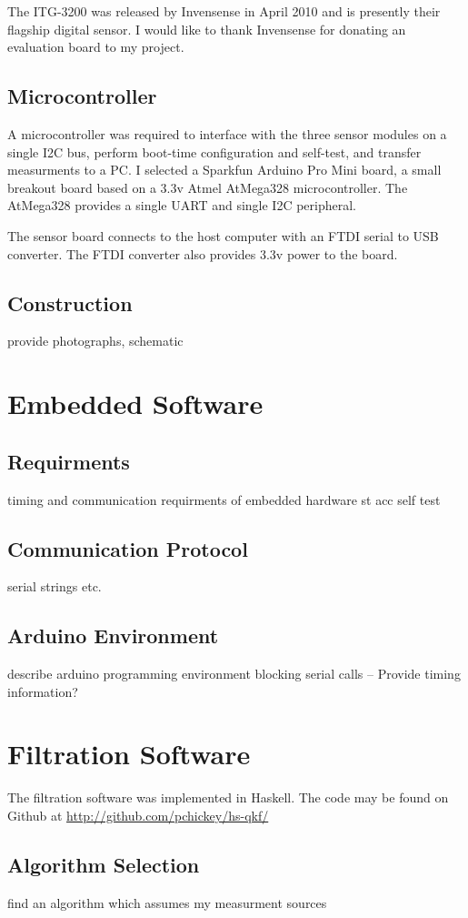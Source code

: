 \documentclass[12pt]{report}
\begin{document}
The ITG-3200 was released by Invensense in April 2010 and is presently their flagship digital sensor. I would like to thank Invensense for donating an evaluation board to my project. 

\subsection{Microcontroller}
A microcontroller was required to interface with the three sensor modules on a single I2C bus, perform boot-time configuration and self-test, and transfer measurments to a PC. I selected a Sparkfun Arduino Pro Mini board, a small breakout board based on a 3.3v Atmel AtMega328 microcontroller. The AtMega328 provides a single UART and single I2C peripheral. 

The sensor board connects to the host computer with an FTDI serial to USB converter. The FTDI converter also provides 3.3v power to the board.

\subsection{Construction}
provide photographs, schematic


\section{Embedded Software}
\subsection{Requirments}
timing and communication requirments of embedded hardware
st acc self test
\subsection{Communication Protocol}
serial strings etc.
\subsection{Arduino Environment}
describe arduino programming environment
blocking serial calls
-- Provide timing information?

\section{Filtration Software}
The filtration software was implemented in Haskell. The code may be found on Github at \url{http://github.com/pchickey/hs-qkf/}
\subsection{Algorithm Selection}
find an algorithm which assumes my measurment sources
\end{document}
